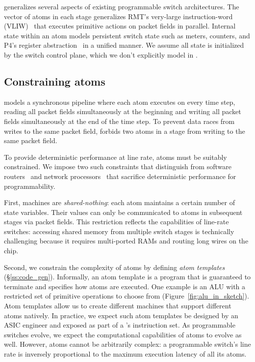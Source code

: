 \absmachine generalizes several aspects of existing programmable switch
architectures. The vector of atoms in each stage generalizes RMT's very-large
instruction-word (VLIW)~\cite{rmt} that executes primitive actions on packet
fields in parallel. Internal state within an atom models persistent switch
state such as meters, counters, and P4's register abstraction~\cite{p4spec} in
a unified manner. We assume all state is initialized by the switch control
plane, which we don't explicitly model in \absmachine.

\subsection{Constraining atoms}
\label{s:atomConstraints}

\absmachine models a synchronous pipeline where each atom executes on every
time step, reading all packet fields simultaneously at the beginning and
writing all packet fields simultaneously at the end of the time step. To prevent
data races from writes to the same packet field, \absmachine forbids two atoms in a
stage from writing to the same packet field.


To provide deterministic performance at line rate, atoms must be suitably
constrained.  We impose two such constraints that distinguish \absmachine from
software routers~\cite{click} and network processors~\cite{ixp4xx} that
sacrifice deterministic performance for programmability.

First, \absmachine machines are \textit{shared-nothing}: each atom maintains a
certain number of state variables.  Their values can only be communicated to
atoms in subsequent stages via packet fields. This restriction reflects the
capabilities of line-rate switches: accessing shared memory from multiple
switch stages is technically challenging because it requires multi-ported RAMs
and routing long wires on the chip.

Second, we constrain the complexity of atoms by defining {\it atom templates}
(\S\ref{ss:code_gen}).  Informally, an atom template is a program that is
guaranteed to terminate and specifies how atoms are executed. One example is an
ALU with a restricted set of primitive operations to choose from
(Figure~\ref{fig:alu_in_sketch}). Atom templates allow us to create different
\absmachine machines that support different atoms natively. In practice, we
expect such atom templates be designed by an ASIC engineer and exposed as part
of a \absmachine's instriuction set. As programmable switches evolve, we expect
the computational capabilities of atoms to evolve as well. However, atoms
cannot be arbitrarily complex: a programmable switch's line rate is inversely
proportional to the maximum execution latency of all its atoms.
